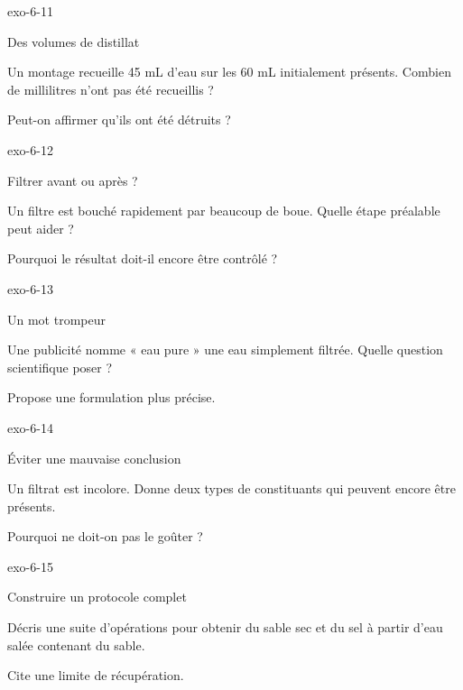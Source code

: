 \documentclass[12pt,twoside,openany]{book}
\begin{document}
\begin{blocLivre}{exo-6-11}
\begin{exercice}[2]{Des volumes de distillat}
\begin{questions}
\item Un montage recueille 45 mL d’eau sur les 60 mL initialement présents. Combien de millilitres n’ont pas été recueillis ?
\item Peut-on affirmer qu’ils ont été détruits ?
\end{questions}
\end{exercice}\end{blocLivre}
\begin{blocLivre}{exo-6-12}
\begin{exercice}[3]{Filtrer avant ou après ?}
\begin{questions}
\item Un filtre est bouché rapidement par beaucoup de boue. Quelle étape préalable peut aider ?
\item Pourquoi le résultat doit-il encore être contrôlé ?
\end{questions}
\end{exercice}\end{blocLivre}
\begin{blocLivre}{exo-6-13}
\begin{exercice}[3]{Un mot trompeur}
\begin{questions}
\item Une publicité nomme « eau pure » une eau simplement filtrée. Quelle question scientifique poser ?
\item Propose une formulation plus précise.
\end{questions}
\end{exercice}\end{blocLivre}
\begin{blocLivre}{exo-6-14}
\begin{exercice}[3]{Éviter une mauvaise conclusion}
\begin{questions}
\item Un filtrat est incolore. Donne deux types de constituants qui peuvent encore être présents.
\item Pourquoi ne doit-on pas le goûter ?
\end{questions}
\end{exercice}\end{blocLivre}
\begin{blocLivre}{exo-6-15}
\begin{exercice}[3]{Construire un protocole complet}
\begin{questions}
\item Décris une suite d’opérations pour obtenir du sable sec et du sel à partir d’eau salée contenant du sable.
\item Cite une limite de récupération.
\end{questions}
\end{exercice}\end{blocLivre}
\end{document}

